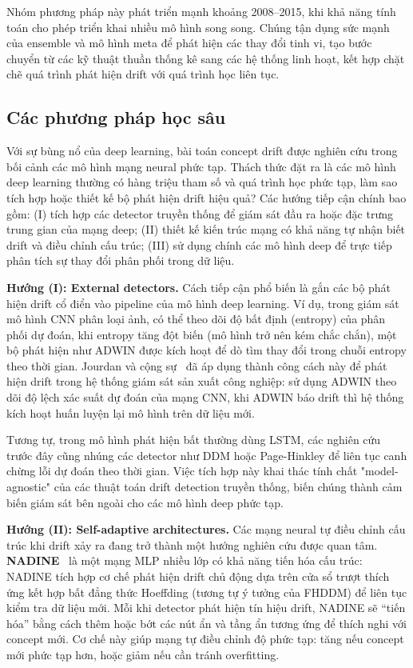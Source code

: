 Nhóm phương pháp này phát triển mạnh khoảng 2008–2015, khi khả năng tính toán cho phép triển khai nhiều mô hình song song. Chúng tận
dụng sức mạnh của ensemble và mô hình meta để phát hiện các thay đổi tinh vi, tạo bước chuyển từ các kỹ thuật thuần thống kê sang các
hệ thống linh hoạt, kết hợp chặt chẽ quá trình phát hiện drift với quá trình học liên tục.

\subsection{Các phương pháp học sâu}
Với sự bùng nổ của deep learning, bài toán concept drift được nghiên cứu trong bối cảnh các mô hình mạng
neural phức tạp. Thách thức đặt ra là các mô hình deep learning thường có hàng triệu tham số và quá trình học phức tạp, làm sao tích
hợp hoặc thiết kế bộ phát hiện drift hiệu quả? Các hướng tiếp cận chính bao gồm: (I) tích hợp các detector truyền thống để giám sát đầu
ra hoặc đặc trưng trung gian của mạng deep; (II) thiết kế kiến trúc mạng có khả năng tự nhận biết drift và điều chỉnh cấu trúc; (III) sử
dụng chính các mô hình deep để trực tiếp phân tích sự thay đổi phân phối trong dữ liệu.

\textbf{Hướng (I): External detectors.} Cách tiếp cận phổ biến là gắn các bộ phát hiện drift cổ điển vào pipeline của mô hình deep learning.
Ví dụ, trong giám sát mô hình CNN phân loại ảnh, có thể theo dõi độ bất định (entropy) của phân phối dự đoán, khi entropy tăng đột
biến (mô hình trở nên kém chắc chắn), một bộ phát hiện như ADWIN được kích hoạt để dò tìm thay đổi trong chuỗi entropy theo thời gian.
Jourdan và cộng sự~\cite{jourdan2023process} đã áp dụng thành công cách này để phát hiện drift trong hệ thống giám sát sản xuất công nghiệp: sử dụng ADWIN theo
dõi độ lệch xác suất dự đoán của mạng CNN, khi ADWIN báo drift thì hệ thống kích hoạt huấn luyện lại mô hình trên dữ liệu mới.

Tương tự, trong mô hình phát hiện bất thường dùng LSTM, các nghiên cứu trước đây cũng nhúng các detector như DDM hoặc Page-Hinkley để liên tục canh chừng lỗi dự đoán theo thời gian. Việc tích hợp này khai thác tính chất "model-agnostic" của các thuật toán drift detection truyền thống, biến chúng thành cảm biến giám sát bên ngoài cho các mô hình deep phức tạp.

\textbf{Hướng (II): Self-adaptive architectures.} Các mạng neural tự điều chỉnh cấu trúc khi drift xảy ra đang trở thành một hướng nghiên cứu được quan tâm. \textbf{NADINE}~\cite{pratama2019automatic} là một mạng MLP nhiều lớp có khả năng tiến hóa cấu trúc: NADINE tích hợp cơ chế phát hiện drift chủ động dựa trên cửa sổ trượt thích ứng kết hợp bất đẳng thức Hoeffding (tương tự ý tưởng của FHDDM) để liên tục kiểm tra dữ liệu mới. Mỗi khi detector phát hiện tín hiệu drift, NADINE sẽ ``tiến hóa'' bằng cách thêm hoặc bớt các nút ẩn và tầng ẩn tương ứng để thích nghi với concept mới. Cơ chế này giúp mạng tự điều chỉnh độ phức tạp: tăng nếu concept mới phức tạp hơn, hoặc giảm nếu cần tránh overfitting.

